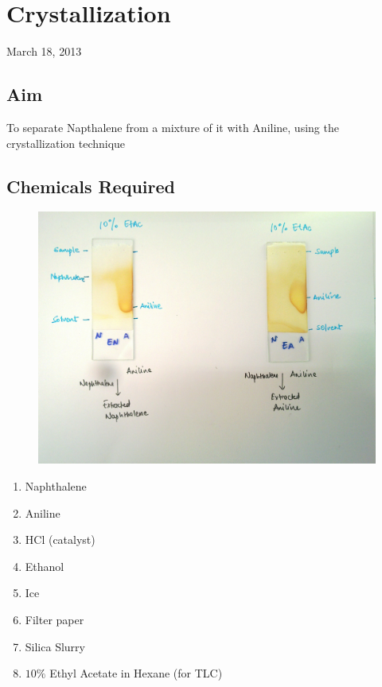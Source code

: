 \chapter{Crystallization}
\begin{flushright}
March 18, 2013
\end{flushright}
\section{Aim}
To separate Napthalene from a mixture of it with Aniline, using the crystallization technique

\section {Chemicals Required}
	\begin{figure}[bth]
		\begin{center}
			\includegraphics[width=1.0\linewidth]{gfx/e9_tlc}
		\end{center}
	\caption[TLC for Napthalene]{\label{e9_tlc}}
	\end{figure}

	\begin{enumerate}
		\item Naphthalene
		\item Aniline
		\item HCl (catalyst)
		\item Ethanol
		\item Ice
		\item Filter paper
		\item Silica Slurry
		\item $10\%$ Ethyl Acetate in Hexane (for TLC)
	\end{enumerate}

